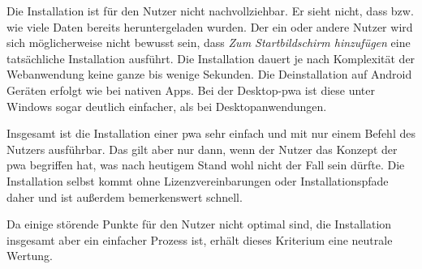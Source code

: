 Die Installation ist für den Nutzer nicht nachvollziehbar. Er sieht nicht, dass bzw. wie viele Daten bereits heruntergeladen wurden. Der ein oder andere Nutzer wird sich möglicherweise nicht bewusst sein, dass \textit{Zum Startbildschirm hinzufügen} eine tatsächliche Installation ausführt. Die Installation dauert je nach Komplexität der Webanwendung keine ganze bis wenige Sekunden. Die Deinstallation auf Android Geräten erfolgt wie bei nativen Apps. Bei der Desktop-\ac{pwa} ist diese unter Windows sogar deutlich einfacher, als bei Desktopanwendungen.

Insgesamt ist die Installation einer \ac{pwa} sehr einfach und mit nur einem Befehl des Nutzers ausführbar. Das gilt aber nur dann, wenn der Nutzer das Konzept der \ac{pwa} begriffen hat, was nach heutigem Stand wohl nicht der Fall sein dürfte. Die Installation selbst kommt ohne Lizenzvereinbarungen oder Installationspfade daher und ist außerdem bemerkenswert schnell.

Da einige störende Punkte für den Nutzer nicht optimal sind, die Installation insgesamt aber ein einfacher Prozess ist, erhält dieses Kriterium eine neutrale Wertung.